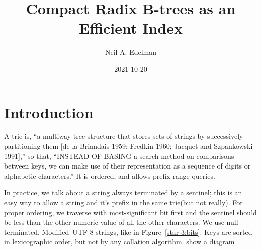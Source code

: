 \documentclass[12pt]{article}
\author{Neil A. Edelman}
\title{Compact Radix B-trees as an Efficient Index}
\date{2021-10-20}
\begin{document}
\maketitle


\section{Introduction}

A trie is, ``a multiway tree structure that stores sets of strings by successively partitioning them [de la Briandais 1959; Fredkin 1960; Jacquet and Szpankowski 1991],''\cite{askitis2011redesigning} so that, ``INSTEAD OF BASING a search method on comparisons between keys, we can make use of their representation as a sequence of digits or alphabetic characters.''\cite{knuth1997sorting} It is ordered, and allows prefix range queries.

In practice, we talk about a string always terminated by a sentinel; this is an easy way to allow a string and it's prefix in the same trie\cite{fredkin1960trie}(but not really). For proper ordering, we traverse with most-significant bit first and the sentinel should be less-than the other numeric value of all the other characters. We use null-terminated, Modified~\mbox{UTF-8} strings, like in Figure~\ref{star-3:bits}. Keys are sorted in lexicographic order, but not by any collation algorithm. show a diagram
\end{document}
